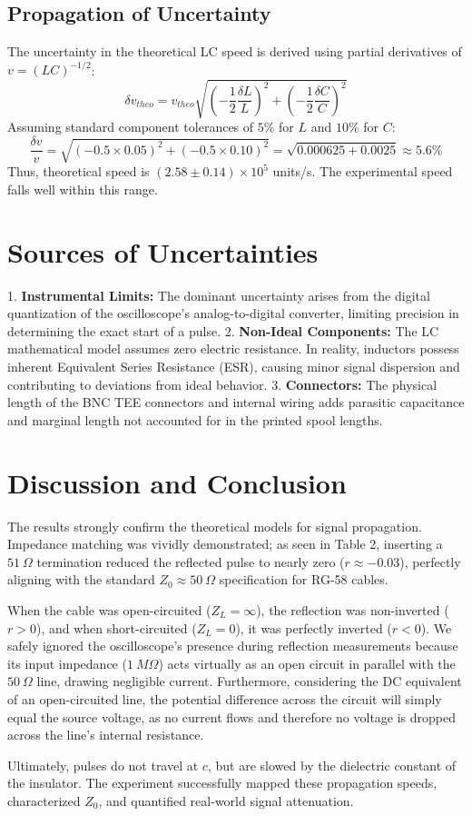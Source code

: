 \documentclass[11pt, letterpaper]{article}
\begin{document}
\subsection{Propagation of Uncertainty}
The uncertainty in the theoretical LC speed is derived using partial derivatives of $v = {(LC)}^{-1/2}$:
\begin{equation}
\delta v_{theo} = v_{theo} \sqrt{ {\left( -\frac{1}{2} \frac{\delta L}{L} \right)}^2 + {\left( -\frac{1}{2} \frac{\delta C}{C} \right)}^2 }
\end{equation}
Assuming standard component tolerances of $5\%$ for $L$ and $10\%$ for $C$:
\begin{equation}
\frac{\delta v}{v} = \sqrt{ {(-0.5 \times 0.05)}^2 + {(-0.5 \times 0.10)}^2 } = \sqrt{0.000625 + 0.0025} \approx 5.6\%
\end{equation}
Thus, theoretical speed is $(2.58 \pm 0.14) \times 10^5$ units/s. The experimental speed falls well within this range.

\section{Sources of Uncertainties}
1. \textbf{Instrumental Limits:} The dominant uncertainty arises from the digital quantization of the oscilloscope's analog-to-digital converter, limiting precision in determining the exact start of a pulse.
2. \textbf{Non-Ideal Components:} The LC mathematical model assumes zero electric resistance. In reality, inductors possess inherent Equivalent Series Resistance (ESR), causing minor signal dispersion and contributing to deviations from ideal behavior.
3. \textbf{Connectors:} The physical length of the BNC TEE connectors and internal wiring adds parasitic capacitance and marginal length not accounted for in the printed spool lengths.

\section{Discussion and Conclusion}
The results strongly confirm the theoretical models for signal propagation. Impedance matching was vividly demonstrated; as seen in Table 2, inserting a $51\ \Omega$ termination reduced the reflected pulse to nearly zero ($r \approx -0.03$), perfectly aligning with the standard $Z_0 \approx 50\ \Omega$ specification for RG-58 cables. 

When the cable was open-circuited ($Z_L = \infty$), the reflection was non-inverted ($r>0$), and when short-circuited ($Z_L = 0$), it was perfectly inverted ($r<0$). We safely ignored the oscilloscope's presence during reflection measurements because its input impedance ($1\ M\Omega$) acts virtually as an open circuit in parallel with the $50\ \Omega$ line, drawing negligible current. Furthermore, considering the DC equivalent of an open-circuited line, the potential difference across the circuit will simply equal the source voltage, as no current flows and therefore no voltage is dropped across the line's internal resistance.

Ultimately, pulses do not travel at $c$, but are slowed by the dielectric constant of the insulator. The experiment successfully mapped these propagation speeds, characterized $Z_0$, and quantified real-world signal attenuation.
\end{document}
